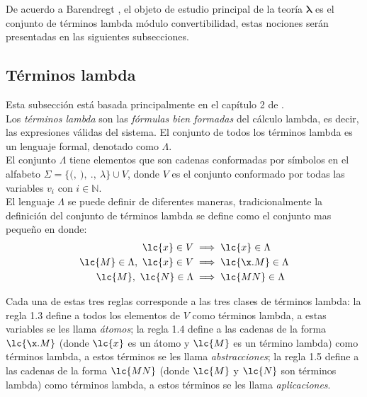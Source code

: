 De acuerdo a Barendregt \cite{Barendregt:Bible}, el objeto de estudio principal
de la teoría \(\boldsymbol{\lambda}\) es el conjunto de términos lambda módulo
convertibilidad, estas nociones serán presentadas en las siguientes
subsecciones. \\

\subsection{Términos lambda}

Esta subsección está basada principalmente en el capítulo 2 de
\cite{Barendregt:Bible}. \\

Los \emph{términos lambda} son las \emph{fórmulas bien formadas} del cálculo
lambda, es decir, las expresiones válidas del sistema. El conjunto de todos los
términos lambda es un lenguaje formal, denotado como \(\Lambda\). \\

El conjunto \(\Lambda\) tiene elementos que son cadenas conformadas por símbolos
en el alfabeto \(\Sigma = \{\texttt{(},\ \texttt{)},\ \texttt{.},\ \lambda\}
\cup V\), donde \(V\) es el conjunto conformado por todas las variables
\(v_{i}\) con \(i\in \mathbb{N}\). \\

El lenguaje \(\Lambda\) se puede definir de diferentes maneras,
tradicionalmente la definición del conjunto de términos lambda se define como el
conjunto mas pequeño en donde: \\

\begin{align}
  \lc{x} \in V &\implies \lc{x} \in \Lambda \\
  \lc{M} \in \Lambda,\ \lc{x} \in V &\implies \lc{\x.M} \in \Lambda \\
  \lc{M},\ \lc{N} \in \Lambda &\implies \lc{M N} \in \Lambda \\
\end{align}

Cada una de estas tres reglas corresponde a las tres clases de términos lambda:
la regla 1.3 define a todos los elementos de \(V\) como términos lambda, a estas
variables se les llama \emph{átomos}; la regla 1.4 define a las cadenas de la
forma \(\lc{\x.M}\) (donde \(\lc{x}\) es un átomo y \(\lc{M}\) es un término
lambda) como términos lambda, a estos términos se les llama
\emph{abstracciones}; la regla 1.5 define a las cadenas de la forma \(\lc{M N}\)
(donde \(\lc{M}\) y \(\lc{N}\) son términos lambda) como términos lambda, a
estos términos se les llama \emph{aplicaciones}. \\

